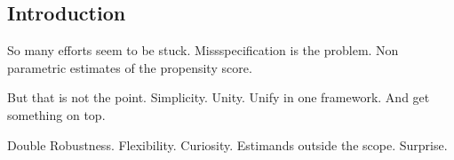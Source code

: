 \subsection*{Introduction}
So many efforts seem to be stuck.
Missspecification is the problem.
Non parametric estimates of the propensity score.

But that is not the point.
Simplicity. Unity.
Unify in one framework.
And get something on top.

Double Robustness.
Flexibility. Curiosity.
Estimands outside the scope.
Surprise.
%
%
